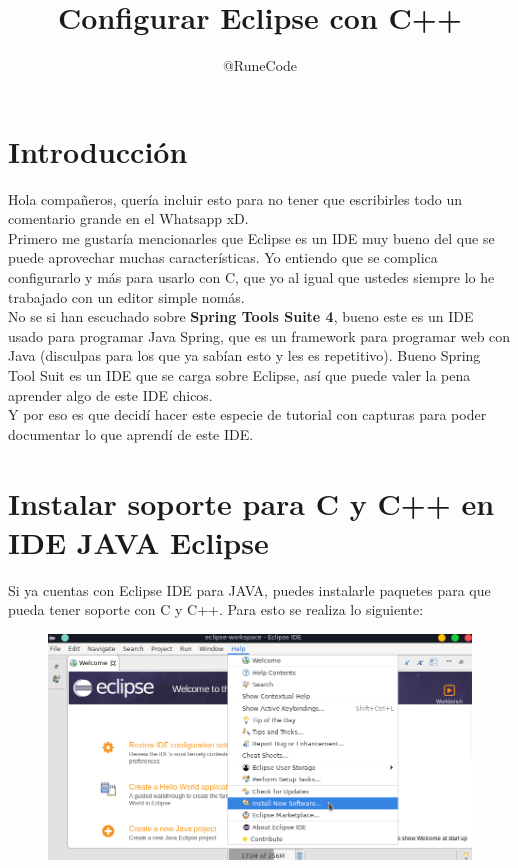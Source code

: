 \documentclass{article}
\title{Configurar Eclipse con C++}
\author{@RuneCode}
\begin{document}
% 

\section{Introducción}%
Hola compañeros, quería incluir esto para no tener que escribirles todo un
comentario grande en el Whatsapp xD.\\

Primero me gustaría mencionarles que Eclipse es un IDE muy bueno del que se
puede aprovechar muchas características. Yo entiendo que se complica
configurarlo y más para usarlo con C, que yo al igual que ustedes siempre lo he
trabajado con un editor simple nomás.\\

No se si han escuchado sobre \textbf{Spring Tools Suite 4}, bueno este es un IDE
usado para programar Java Spring, que es un framework para programar web con
Java (disculpas para los que ya sabían esto y les es repetitivo). Bueno Spring
Tool Suit es un IDE que se carga sobre Eclipse, así que puede valer la pena
aprender algo de este IDE chicos.\\

Y por eso es que decidí hacer este especie de tutorial con capturas para poder
documentar lo que aprendí de este IDE.

\newpage


\section*{Instalar soporte para C y C++ en IDE JAVA Eclipse}%
Si ya cuentas con Eclipse IDE para JAVA, puedes instalarle paquetes para que
pueda tener soporte con C y C++. Para esto se realiza lo siguiente:

\begin{figure}[h!]
  \centering
  \includegraphics[scale=0.75]{./Pictures/001_eclipse_help.png}
\end{figure}
\end{document}
